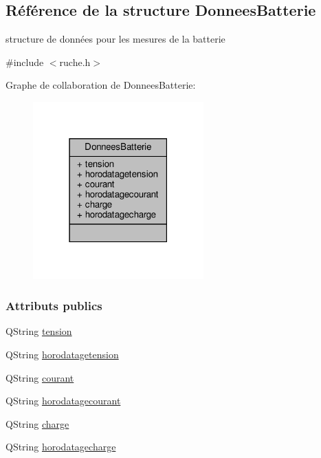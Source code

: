 \hypertarget{struct_donnees_batterie}{}\subsection{Référence de la structure Donnees\+Batterie}
\label{struct_donnees_batterie}


structure de données pour les mesures de la batterie  




{\ttfamily \#include $<$ruche.\+h$>$}



Graphe de collaboration de Donnees\+Batterie\+:\nopagebreak
\begin{figure}[H]
\begin{center}
\leavevmode
\includegraphics[width=186pt]{struct_donnees_batterie__coll__graph}
\end{center}
\end{figure}
\subsubsection*{Attributs publics}
\begin{DoxyCompactItemize}
\item 
Q\+String \hyperlink{struct_donnees_batterie_a1394510ba159a846820452e9e333f38b}{tension}
\item 
Q\+String \hyperlink{struct_donnees_batterie_ac19dd5bb96d677e228ddd22159076d26}{horodatagetension}
\item 
Q\+String \hyperlink{struct_donnees_batterie_a7a996ea5eacd6839a8a34dbbe48eb59a}{courant}
\item 
Q\+String \hyperlink{struct_donnees_batterie_a1318c296d4e6926304851a7cef0ad957}{horodatagecourant}
\item 
Q\+String \hyperlink{struct_donnees_batterie_a4d3cf76cf1722835a6449bc4a29e761b}{charge}
\item 
Q\+String \hyperlink{struct_donnees_batterie_a98859495d938a84f1c6aa818e0d31e82}{horodatagecharge}
\end{DoxyCompactItemize}


